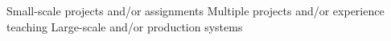 \documentclass[10pt]{article}
\begin{document}
\setlength{\columnsep}{-2cm}
\begin{multicols}{5}
\raggedcolumns
\begin{small}
\begin{itemize}
\renewcommand{\labelitemi}{}
\renewcommand{\skill}{\textnormal}
\setlength{\itemsep}{1pt}
\setlength{\parskip}{0pt}
\setlength{\parsep}{0pt}

\skills{\bash}{\threeskill}
\skills{\clojure}{\threeskill}
\skills{\java}{\threeskill}
\skills{\js}{\twoskill}
\skills{\LaTeX}{\twoskill}
\skills{\python}{\threeskill}
\skills{\matlab}{\twoskill}

\skills{\django}{\twoskill}
\skills{\git}{\threeskill}
\skills{\numpy/\scipy}{\threeskill}
\skills{\opencv}{\threeskill}

\skills{\postgres}{\threeskill}
\skills{\spark}{\threeskill}


\end{itemize}
\end{small}
\end{multicols}
\setlength{\columnsep}{0pt}

\vspace{-1.5em}

\begin{footnotesize}
  \oneskill Small-scale projects and/or assignments \hfill
  \twoskill Multiple projects and/or experience teaching \hfill
  \threeskill Large-scale and/or production systems
\end{footnotesize}

\newcommand{\proj}[3]{
  \textsc{#1} & #2\\
   &\href{http://www.#3}{#3}\\
   \multicolumn{2}{c}{} \\ [-1ex]
}
\end{document}
